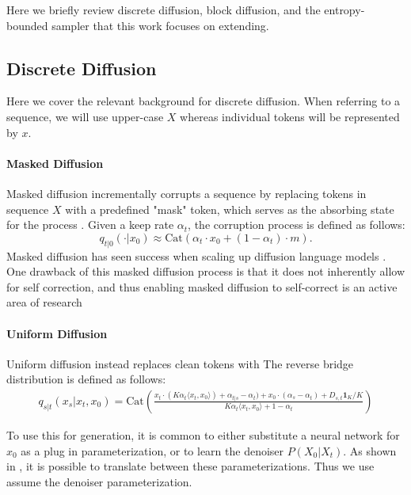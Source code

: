 Here we briefly review discrete diffusion, block diffusion, and the entropy-bounded sampler that this work focuses on extending.
\subsection{Discrete Diffusion}
Here we cover the relevant background for discrete diffusion. 
When referring to a sequence, we will use upper-case $X$ whereas individual tokens will be represented by $x$.

\paragraph{Masked Diffusion}
Masked diffusion incrementally corrupts a sequence by replacing tokens in sequence $X$ with a predefined "mask" token, which serves as the absorbing state for the process \citep{campbell2022continuous, sahoo2024simple, shi2024simplified}.
Given a keep rate $\alpha_t$, the corruption process is defined as follows: 
\[
q_{t|0}(\cdot | x_0) \approx \text{Cat} \left( \alpha_t \cdot x_0 + (1 - \alpha_t) \cdot m\right).
\]
Masked diffusion has seen success when scaling up diffusion language models \citep{nie2026large, ye2025dream7bdiffusionlarge}.
One drawback of this masked diffusion process is that it does not inherently allow for self correction, and thus enabling masked diffusion to self-correct is an active area of research \citep{kim2025fine}

\paragraph{Uniform Diffusion}
Uniform diffusion instead replaces clean tokens with 
The reverse bridge distribution is defined as follows: 
\begin{align}
\label{eq:bridge}
    q_{s|t}(x_s | x_t, x_0) = \text{Cat} \left( \frac{x_t \cdot (K\alpha_t \langle x_t, x_0 \rangle) + \alpha_{t|s} - \alpha_t ) + x_0 \cdot ( \alpha_s - \alpha_t) + D_{s,t} \mathbf{1}_K / K}{K \alpha_t \langle x_t, x_0 \rangle + 1 - \alpha_t} \right)
\end{align}

To use this for generation, it is common to either substitute a neural network for $x_0$ as a plug in parameterization, or to learn the denoiser $P(X_0 | X_t)$. As shown in \citet{gourevitch2026uniform}, it is possible to translate between these parameterizations. Thus we use assume the denoiser parameterization.


